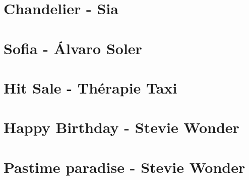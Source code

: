 \documentclass{guitartabs}
\begin{document}
\section{Chandelier - Sia}
\begin{guitar}

\end{guitar}


\section{Sofia - Álvaro Soler}
\begin{guitar}

\end{guitar}


\section{Hit Sale - Thérapie Taxi}
\begin{guitar}

\end{guitar}

\section{Happy Birthday - Stevie Wonder}
\begin{guitar}

\end{guitar}



\section{Pastime paradise - Stevie Wonder}
\begin{guitar}

\end{guitar}
\end{document}
